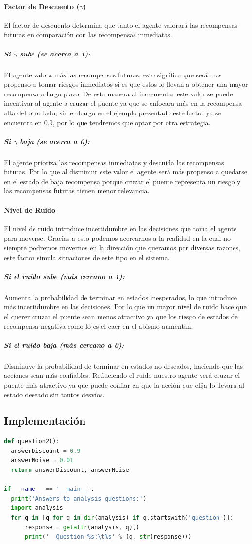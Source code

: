 \documentclass{report}
\begin{document}
        \paragraph*{Factor de Descuento (\(\gamma\))}{
          El factor de descuento determina que tanto el agente valorará las recompensas futuras en comparación con las recompensas inmediatas.
        }
        \subparagraph*{Si \(\gamma\) sube (se acerca a 1):}{
          El agente valora más las recompensas futuras, esto significa que será mas propenso a tomar riesgos inmediatos si es que estos lo llevan a obtener una mayor recompensa a largo plazo. De esta manera al incrementar este valor se puede incentivar al agente a cruzar el puente ya que se enfocara más en la recompensa alta del otro lado, sin embargo en el ejemplo presentado este factor ya se encuentra en 0.9, por lo que tendremos que optar por otra estrategia.
        }
        \subparagraph*{Si \(\gamma\) baja (se acerca a 0):}{
          El agente prioriza las recompensas inmediatas y descuida las recompensas futuras. Por lo que al disminuir este valor el agente será más propenso a quedarse en el estado de baja recompensa porque cruzar el puente representa un riesgo y las recompensas futuras tienen menor relevancia.
        }
        \paragraph*{Nivel de Ruido}{
          El nivel de ruido introduce incertidumbre en las decisiones que toma el agente para moverse. Gracias a esto podemos acercarnos a la realidad en la cual no siempre podremos movernos en la dirección que queramos por diversas razones, este factor simula situaciones de este tipo en el sistema.
        }
        \subparagraph*{Si el ruido sube (más cercano a 1):}{
          Aumenta la probabilidad de terminar en estados inesperados, lo que introduce más incertidumbre en las decisiones. Por lo que un mayor nivel de ruido hace que el querer cruzar el puente sean menos atractivo ya que los riesgo de estados de recompensa negativa como lo es el caer en el abismo aumentan.
        }
        \subparagraph*{Si el ruido baja (más cercano a 0):}{
          Disminuye la probabilidad de terminar en estados no deseados, haciendo que las acciones sean más confiables. Reduciendo el ruido nuestro agente verá cruzar el puente más atractivo ya que puede confiar en que la acción que elija lo llevara al estado deseado sin tantos desvíos.
        }
      \subsection*{Implementación}
\begin{lstlisting}[language=Python, caption=Análisis de cruce de puentes]
def question2():
  answerDiscount = 0.9
  answerNoise = 0.01
  return answerDiscount, answerNoise

if __name__ == '__main__':
  print('Answers to analysis questions:')
  import analysis
  for q in [q for q in dir(analysis) if q.startswith('question')]:
      response = getattr(analysis, q)()
      print('  Question %s:\t%s' % (q, str(response)))
\end{lstlisting}
\end{document}
